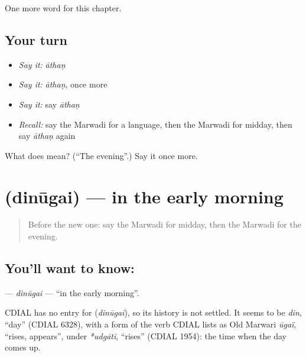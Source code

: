 \begin{grammarlens}[title={What you've built}]
One more word for this chapter.
\end{grammarlens}

\subsection*{Your turn}
\begin{itemize}
\raggedright
  \item \emph{Say it:} \emph{āthaṇ}
  \item \emph{Say it:} \emph{āthaṇ}, once more
  \item \emph{Say it:} say \emph{āthaṇ}
  \item \emph{Recall:} say the Marwadi for a language, then the Marwadi for midday, then say \emph{āthaṇ} again
\end{itemize}

\begin{tcolorbox}[breakable,colback=teal!4,colframe=teal!35!black,title={Before you move on}]
What does  mean? (\textquotedblleft{}The evening\textquotedblright{}.) Say it once more.
\end{tcolorbox}
\section[\texorpdfstring{\mw{दिनूगै} (dinūgai)}{दिनूगै (dinūgai)}]{ (dinūgai) — in the early morning}

\label{lesson:MW-C90-dinugai}



\begin{quote}
Before the new one: say the Marwadi for midday, then the Marwadi for the evening.
\end{quote}

\subsection*{You'll want to know: }
\textbf{} — \emph{dinūgai} — \textquotedblleft{}in the early morning\textquotedblright{}.

\begin{cousinweb}
CDIAL has no entry for \textbf{} (\emph{dinūgai}), so its history is not settled. It seems to be \emph{din}, \textquotedblleft{}day\textquotedblright{} (CDIAL 6328), with a form of the verb CDIAL lists as Old Marwari \emph{ūgaï}, \textquotedblleft{}rises, appears\textquotedblright{}, under \emph{*udgāti}, \textquotedblleft{}rises\textquotedblright{} (CDIAL 1954): the time when the day comes up.
\end{cousinweb}

